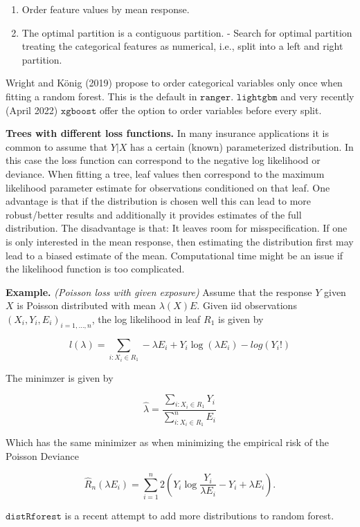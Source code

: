 \documentclass[a4paper,12pt,openany]{book}
\providecommand{\tightlist}{%
 \setlength{\itemsep}{0pt}\setlength{\parskip}{0pt}}
\begin{document}
\begin{enumerate}
\def\labelenumi{\arabic{enumi}.}
\tightlist
\item
  Order feature values by mean response.
\item
  The optimal partition is a contiguous partition.
  - Search for optimal partition treating the categorical features as numerical, i.e., split into a left and right partition.
\end{enumerate}

Wright and König (2019) propose to order categorical variables only once when fitting a random forest. This is the default in \(\texttt{ranger}\). \(\texttt{lightgbm}\) and very recently (April 2022) \(\texttt{xgboost}\) offer the option to order variables before every split.

\textbf{Trees with different loss functions.} In many insurance applications it is common to assume that \(Y|X\) has a certain (known) parameterized distribution. In this case the loss function can correspond to the negative log likelihood or deviance. When fitting a tree, leaf values then correspond to the maximum likelihood parameter estimate for observations conditioned on that leaf. One advantage is that if the distribution is chosen well this can lead to more robust/better results and additionally it provides estimates of the full distribution. The disadvantage is that: It leaves room for misspecification. If one is only interested in the mean response, then estimating the distribution first may lead to a biased estimate of the mean. Computational time might be an issue if the likelihood function is too complicated.

\textbf{Example.} \emph{(Poisson loss with given exposure)} Assume that the response \(Y\) given \(X\) is Poisson distributed with mean \(\lambda(X)E\). Given iid observations \((X_i,Y_i,E_i)_{i=1,\dots,n}\), the log likelihood in leaf \(R_1\) is given by

\[
l(\lambda)= \sum_{i: X_i\in R_1} -\lambda E_i+ Y_i\log(\lambda E_i)-log(Y_i!)
\]

The minimzer is given by

\[
\hat \lambda = \frac{\sum_{i: X_i\in R_1}  Y_i}{\sum_{i: X_i\in R_1} ^n E_i}
\]

Which has the same minimizer as when minimizing the empirical risk of the Poisson Deviance

\[
\hat R_n(\lambda E_i)=\sum_{i=1}^n 2\left(Y_i\log {\frac {Y_i}{\lambda E_i }}-Y_i+\lambda E_i \right).
\]

\href{https://github.com/henckr/distRforest}{\(\texttt{distRforest}\)} is a recent attempt to add more distributions to random forest.
\end{document}

